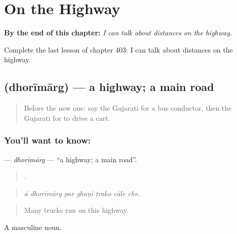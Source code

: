 
\chapter{On the Highway}
\label{ch:gu-on-the-highway}

\begin{chapteropening}
\textbf{By the end of this chapter:} \emph{I can talk about distances on the highway.}

Complete the last lesson of chapter 403: I can talk about distances on the highway.
\end{chapteropening}

\section[\texorpdfstring{\gu{ધોરીમાર્ગ} (dhorīmārg)}{ધોરીમાર્ગ (dhorīmārg)}]{ (dhorīmārg) — a highway; a main road}

\label{lesson:GU-C403-dhorimarg}



\begin{quote}
Before the new one: say the Gujarati for a bus conductor, then the Gujarati for to drive a cart.
\end{quote}

\subsection*{You'll want to know: }
\textbf{} — \emph{dhorīmārg} — \textquotedblleft{}a highway; a main road\textquotedblright{}.

\begin{quote}
      .
\end{quote}

\begin{quote}
\emph{ā dhorīmārg par ghaṇī ṭrako cāle che.}
\end{quote}

\begin{quote}
Many trucks run on this highway.
\end{quote}

A masculine noun.

